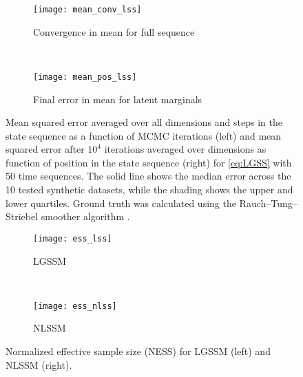 \begin{figure*}[t]
	\centering
	\begin{subfigure}[t]{0.49\textwidth}
		\texttt{[image: mean\_conv\_lss]}
		\caption{Convergence in mean for full sequence}
		\label{fig:meanConv}
	\end{subfigure}
	~  %
	\begin{subfigure}[t]{0.49\textwidth}
		\texttt{[image: mean\_pos\_lss]}
		\caption{Final error in mean for latent marginals}
		\label{fig:meanPos}
	\end{subfigure}
	
	\caption{Mean squared error averaged over all dimensions and steps in the state sequence as a function of MCMC iterations (left) and mean squared error after $10^4$ iterations averaged over dimensions as function of position in the state sequence (right) for \eqref{eq:LGSS} with 50 time sequences.  The solid line shows the median error across the 10 tested synthetic datasets, while the shading shows the upper and lower quartiles.  Ground truth was calculated using the Rauch--Tung--Striebel smoother algorithm \cite{rauch1965maximum}. 
		\label{fig:groundTruth}}
\end{figure*}

\begin{figure*}[t]
	\centering
	\begin{subfigure}[t]{0.49\textwidth}
		\texttt{[image: ess\_lss]}
		\caption{LGSSM}
	\end{subfigure}
	~ %
	\begin{subfigure}[t]{0.49\textwidth}
		\texttt{[image: ess\_nlss]}
		\caption{NLSSM}
	\end{subfigure}

	\caption{Normalized effective sample size  (NESS) for LGSSM (left) and NLSSM (right).
		\label{fig:ESS}}
\end{figure*}

